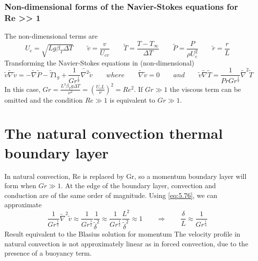 	\subsubsection{Non-dimensional forms of the Navier-Stokes equations for Re >> 1}
	The non-dimensional terms are
	\begin{equation}
		U_{c} = \sqrt{L g \beta _T \Delta T} \qquad \tilde{v} = \frac{v}{U_{cv}} \qquad \tilde{T} = \frac{T-T_\infty}{\Delta T} \qquad \tilde{P} = \frac{P}{\rho U^2_c} \qquad \tilde{r} = \frac{r}{L}
	\end{equation}
	Transforming the Navier-Stokes equations in (non-dimensional)
	\begin{equation}
		\tilde{v} \tilde{\nabla} \tilde{v} = - \tilde{\nabla} \tilde{P} - \tilde{T} 1_g + \frac{1}{Gr ^{\frac{1}{2}}} \tilde{\nabla ^2} \tilde{v} \qquad where \qquad \tilde{\nabla} \tilde{v}= 0 \qquad and \qquad \tilde{v} \tilde{\nabla} \tilde{T} = \frac{1}{Pr Gr^{\frac{1}{2}}} \tilde{\nabla}^2 \tilde{T}
		\label{eq:5.76}
	\end{equation}
	In this case, $Gr = \frac{L^3\beta _T g \Delta T}{\nu ^2} = \left( \frac{U_c L}{\nu}\right) ^2= Re^2 $. If $Gr \gg 1$ the viscous term can be omitted and the condition $Re \gg 1$ is equivalent to $Gr \gg 1$.
	
	\section{The natural convection thermal boundary layer}
		In natural convection, Re is replaced by Gr, so a momentum boundary layer will form when $Gr \gg 1$. At the edge of the boundary layer, convection and conduction are of the same order of magnitude. Using \autoref{eq:5.76}, we can approximate
		\begin{equation}
			\frac{1}{Gr^{\frac{1}{2}}}\tilde{\nabla}^2 \tilde{v} \approx \frac{1}{Gr^{\frac{1}{2}}} \frac{1}{\tilde{\delta}^2} \approx \frac{1}{Gr^{\frac{1}{2}}} \frac{L^2}{\tilde{\delta}^2} \approx 1 \qquad \Rightarrow \qquad \frac{\delta}{L} \approx \frac{1}{Gr^{\frac{1}{4}}} 
		\end{equation}
		Result equivalent to the Blasius solution for momentum
    	The velocity profile in natural convection is not approximately linear as in forced convection, due to the presence of a buoyancy term. \\
    	
